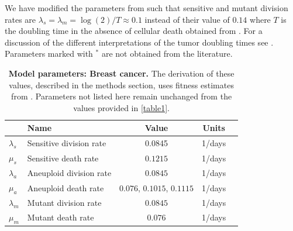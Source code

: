 \documentclass[12pt]{extarticle}
\begin{document}
\begin{table}
\begin{center}
{We have modified the parameters from \citet{bozic2013evolutionary} such that sensitive and mutant division rates are $\lambda_{s} = \lambda_{m} = \log{(2)}/T\approx0.1$ instead of their value of $0.14$ where $T$ is the doubling time in the absence of cellular death obtained from \citet{rew2000cell}. For a discussion of the different interpretations of the tumor doubling times see \citet{avanzini2019cancer}. Parameters marked with $^\ast$ are not obtained from the literature.} %
  \label{table1}
\end{center}
\end{table}

\begin{table}
\begin{center}
  \begin{tabular}{| l |p{5cm}| c | c | p{3cm} |}
    \hline
     & Name & Value & Units \\ \hline
    $\lambda_s$ & Sensitive division rate& 0.0845& 1/days \\ \hline
    $\mu_s$ & Sensitive death rate& $0.1215$ & 1/days   \\ \hline
    $\lambda_a$  & Aneuploid division rate & $0.0845$ & 1/days    \\ \hline
    $\mu_a$ & Aneuploid death rate & $0.076$, $0.1015$, $0.1115$ & 1/days   \\ \hline
    $\lambda_m$  & Mutant division rate & $0.0845$ & 1/days    \\ \hline
    $\mu_m$ & Mutant death rate & $0.076$ & 1/days   \\ \hline
  \end{tabular}
\caption{\textbf{Model parameters: Breast cancer.} 
The derivation of these values, described in the methods section, uses fitness estimates from \citet{salehi2021clonal}.
Parameters not listed here remain unchanged from the values provided in \cref{table1}.
}
  \label{table2}
\end{center}
\end{table}

\end{document}
